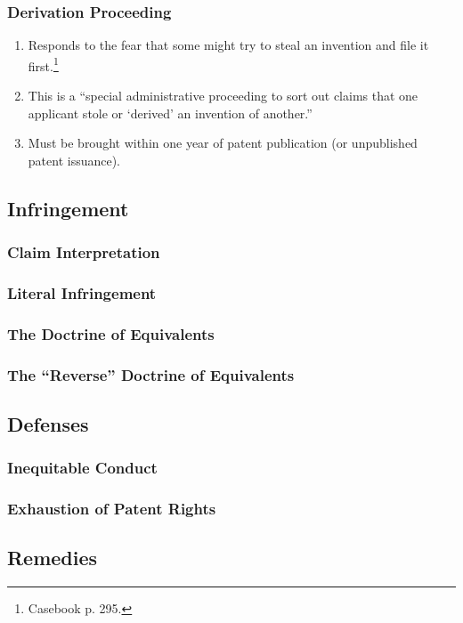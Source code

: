 \subsubsection{Derivation Proceeding}

\begin{enumerate}
    \item Responds to the fear that some might try to steal an invention and 
    file it first.\footnote{Casebook p. 295.}
    \item This is a ``special administrative proceeding to sort out claims that 
    one applicant stole or `derived' an invention of another.''
    \item Must be brought within one year of patent publication (or unpublished 
    patent issuance).
\end{enumerate}

\subsection{Infringement}

\subsubsection{Claim Interpretation}


\subsubsection{Literal Infringement}


\subsubsection{The Doctrine of Equivalents}



\subsubsection{The ``Reverse'' Doctrine of Equivalents}


\subsection{Defenses}

\subsubsection{Inequitable Conduct}


\subsubsection{Exhaustion of Patent Rights}



\subsection{Remedies}


